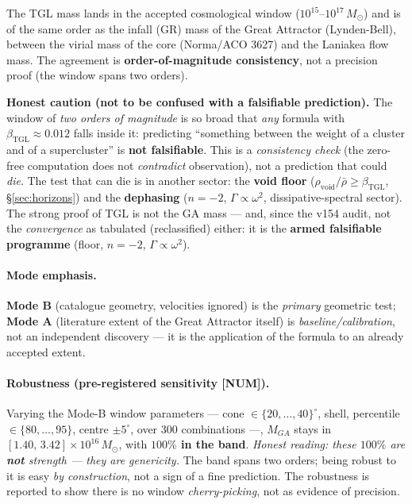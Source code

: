 \documentclass[11pt]{article}
\newcommand{\bTGL}{\beta_{\mathrm{TGL}}}\newcommand{\Msun}{M_{\odot}}\newcommand{\TGL}{\mathrm{TGL}}
\theoremstyle{definition}\newtheorem{deriv}{Derivation}
\begin{document}
The TGL mass lands in the accepted cosmological window ($10^{15}$--$10^{17}\,\Msun$) and is of the same order as the infall (GR) mass of the Great Attractor (Lynden-Bell), between the virial mass of the core (Norma/ACO 3627) and the Laniakea flow mass. The agreement is \textbf{order-of-magnitude consistency}, not a precision proof (the window spans two orders).

\textbf{Honest caution (not to be confused with a falsifiable prediction).} The window of \emph{two orders of magnitude} is so broad that \emph{any} formula with $\bTGL\approx0.012$ falls inside it: predicting ``something between the weight of a cluster and of a supercluster'' is \textbf{not falsifiable}. This is a \emph{consistency check} (the zero-free computation does not \emph{contradict} observation), not a prediction that could \emph{die}. The test that can die is in another sector: the \textbf{void floor} ($\rho_{\mathrm{void}}/\bar\rho\geq\bTGL$, \S\ref{sec:horizons}) and the \textbf{dephasing} ($n=-2$, $\Gamma\propto\omega^2$, dissipative-spectral sector). The strong proof of TGL is not the GA mass --- and, since the v154 audit, not the \emph{convergence} as tabulated (reclassified) either: it is the \textbf{armed falsifiable programme} (floor, $n=-2$, $\Gamma\propto\omega^2$).

\paragraph{Mode emphasis.} \textbf{Mode B} (catalogue geometry, velocities ignored) is the \emph{primary} geometric test; \textbf{Mode A} (literature extent of the Great Attractor itself) is \emph{baseline/calibration}, not an independent discovery --- it is the application of the formula to an already accepted extent.

\paragraph{Robustness (pre-registered sensitivity \textsf{[NUM]}).} Varying the Mode-B window parameters --- cone $\in\{20,\dots,40\}^\circ$, shell, percentile $\in\{80,\dots,95\}$, centre $\pm5^\circ$, over $300$ combinations ---, $M_{GA}$ stays in $[1.40,\,3.42]\times10^{16}\,\Msun$, with \textbf{$100\%$ in the band}. \emph{Honest reading: these $100\%$ are \textbf{not} strength --- they are genericity.} The band spans two orders; being robust to it is easy \emph{by construction}, not a sign of a fine prediction. The robustness is reported to show there is no window \emph{cherry-picking}, not as evidence of precision.
\end{document}
